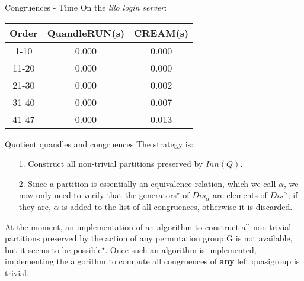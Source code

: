 \begin{frame}{Congruences - Time}
On the \emph{lilo login server}: \newline
    \begin{center}
    \begin{tabular}{|c|c|c|}
        \hline
         Order & \textsf{QuandleRUN}(s) & \textsc{CREAM}(s) \\ \hline
          1-10 & 0.000 & 0.000 \\ \hline
         11-20 & 0.000 & 0.000 \\ \hline
         21-30 & 0.000 & 0.002\\ \hline
         31-40 & 0.000 & 0.007\\ \hline
         41-47 & 0.000 & 0.013 \\ \hline
    \end{tabular}
\end{center}
\end{frame}
\begin{frame}{Quotient quandles and congruences}
    The strategy is:
    \begin{itemize}
        \item[1.] Construct all non-trivial partitions preserved by $Inn(Q)$.
        \item[2.] Since a partition is essentially an equivalence relation, which we call $\alpha$, we now only need to verify that the generators$^\star$ of $Dis_\alpha$ are elements of $Dis^\alpha$; if they are, $\alpha$ is added to the list of all congruences, otherwise it is discarded.  
    \end{itemize}
    At the moment, an implementation of an algorithm to construct all non-trivial partitions preserved by the action of any permutation group G is not available, but it seems to be possible$^\star$. Once such an algorithm is implemented, implementing the algorithm to compute all congruences of \textbf{any} left quasigroup is trivial.\newline\newline
\end{frame}



